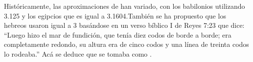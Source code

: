 \documentclass[preview]{standalone}
\begin{document}
\begin{center}
Históricamente, las aproximaciones de \pi han variado, con los babilonios utilizando 3.125 y los egipcios  que es igual a 3.1604.También se ha propuesto que los hebreos usaron \pi igual a 3 basándose en un verso bíblico I de Reyes 7:23 que dice: ``Luego hizo el mar de fundición, que tenía diez codos de borde a borde; era completamente redondo, su altura era de cinco codos y una línea de treinta codos lo rodeaba.'' Acá se deduce que se tomaba \pi como .
\end{center}
\end{document}
